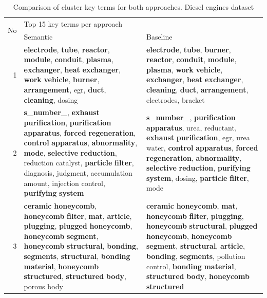 \begin{table}[htbp]
  \centering
  \caption{Comparison of cluster key terms for both approaches. Diesel engines dataset}
    \begin{tabular}{|r|p{17em}|p{17em}|}
    \toprule
    \multicolumn{1}{|c|}{\multirow{2}[4]{*}{No}} & \multicolumn{2}{p{27.61em}|}{Top 15 key terms per approach} \\
\cmidrule{2-3}      & Semantic & Baseline \\
    \midrule
    1 & \textbf{electrode}, \textbf{tube}, \textbf{reactor}, \textbf{module}, \textbf{conduit}, \textbf{plasma}, \textbf{exchanger}, \textbf{heat} \textbf{exchanger}, \textbf{work} \textbf{vehicle}, \textbf{burner}, \textbf{arrangement}, egr, \textbf{duct}, \textbf{cleaning}, dosing & \textbf{electrode}, \textbf{tube}, \textbf{burner}, \textbf{reactor}, \textbf{conduit}, \textbf{module}, \textbf{plasma}, \textbf{work} \textbf{vehicle}, \textbf{exchanger}, \textbf{heat} \textbf{exchanger}, \textbf{cleaning}, \textbf{duct}, \textbf{arrangement}, electrodes, bracket \\
    \midrule
    2 & \textbf{s\_number\_}, \textbf{exhaust} \textbf{purification}, \textbf{purification} \textbf{apparatus}, \textbf{forced} \textbf{regeneration}, \textbf{control} \textbf{apparatus}, \textbf{abnormality}, \textbf{mode}, \textbf{selective} \textbf{reduction}, reduction catalyst, \textbf{particle} \textbf{filter}, diagnosis, judgment, accumulation amount, injection control, \textbf{purifying} \textbf{system} & \textbf{s\_number\_}, \textbf{purification} \textbf{apparatus}, urea, reductant, \textbf{exhaust} \textbf{purification}, egr, urea water, \textbf{control} \textbf{apparatus}, \textbf{forced} \textbf{regeneration}, \textbf{abnormality}, \textbf{selective} \textbf{reduction}, \textbf{purifying} \textbf{system}, dosing, \textbf{particle} \textbf{filter}, mode \\
    \midrule
    3 & \textbf{ceramic} \textbf{honeycomb}, \textbf{honeycomb} \textbf{filter}, \textbf{mat}, \textbf{article}, \textbf{plugging}, \textbf{plugged} \textbf{honeycomb}, \textbf{honeycomb} \textbf{segment}, \textbf{honeycomb} \textbf{structural}, \textbf{bonding}, \textbf{segments}, \textbf{structural}, \textbf{bonding} \textbf{material}, \textbf{honeycomb} \textbf{structured}, \textbf{structured} \textbf{body}, porous body & \textbf{ceramic} \textbf{honeycomb}, \textbf{mat}, \textbf{honeycomb} \textbf{filter}, \textbf{plugging}, \textbf{honeycomb} \textbf{structural}, \textbf{plugged} \textbf{honeycomb}, \textbf{honeycomb} \textbf{segment}, \textbf{structural}, \textbf{article}, \textbf{bonding}, \textbf{segments}, pollution control, \textbf{bonding} \textbf{material}, \textbf{structured} \textbf{body}, \textbf{honeycomb} \textbf{structured} \\

\end{tabular}
\end{table}
